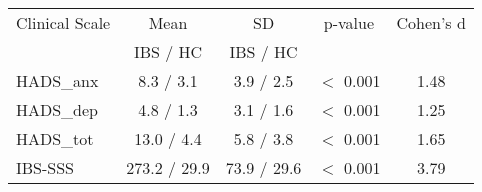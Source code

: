 \begin{tabular}{l|c|c|c|c|}
Clinical Scale      &    Mean     &     SD     & p-value & Cohen's d \\
                    &  IBS / HC   &  IBS / HC  &         &            \\
\hline
HADS\_anx            & 8.3 / 3.1 & 3.9 / 2.5  &  $<$ 0.001    &   1.48      \\
HADS\_dep            & 4.8 / 1.3 & 3.1 / 1.6  &  $<$ 0.001    &   1.25      \\
HADS\_tot            & 13.0 / 4.4 & 5.8 / 3.8  &  $<$ 0.001    &   1.65      \\
IBS-SSS             & 273.2 / 29.9 & 73.9 / 29.6  &  $<$ 0.001    &   3.79      \\
\end{tabular}
